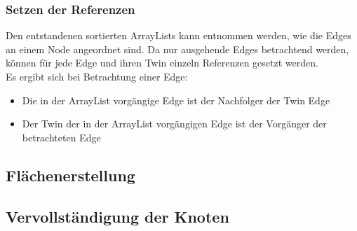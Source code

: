 \subsubsection{Setzen der Referenzen}
Den entstandenen sortierten ArrayLists kann entnommen werden, wie die Edges an einem Node angeordnet sind.
Da nur ausgehende Edges betrachtend werden, können für jede Edge und ihren Twin einzeln Referenzen gesetzt werden.\\
Es ergibt sich bei Betrachtung einer Edge:
\begin{itemize}
	\item Die in der ArrayList vorgängige Edge ist der Nachfolger der Twin Edge
	\item Der Twin der in der ArrayList vorgängigen Edge ist der Vorgänger der betrachteten Edge
\end{itemize}

\subsection{Flächenerstellung}

\subsection{Vervollständigung der Knoten}